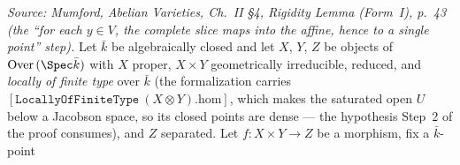 \begin{lemma}
  \label{lem:rigidity_eqOn_saturated_open_to_affine}

  \textit{Source: Mumford, Abelian Varieties, Ch.~II \S4, Rigidity Lemma (Form~I), p.~43 (the
  ``for each \(y \in V\), the complete slice maps into the affine, hence to a single point'' step).}
  Let \(\bar k\) be algebraically closed and let \(X\), \(Y\), \(Z\) be objects of
  \(\mathrm{Over}\,(\Spec \bar k)\) with \(X\) proper, \(X \times Y\) geometrically irreducible, reduced,
  and \emph{locally of finite type} over \(\bar k\) (the formalization carries
  \([\mathtt{LocallyOfFiniteType}\ (X \otimes Y).\mathrm{hom}]\), which makes the saturated open \(U\)
  below a Jacobson space, so its closed points are dense --- the hypothesis Step~2 of the proof
  consumes), and \(Z\) separated. Let \(f \colon X \times Y \to Z\) be a morphism, fix a \(\bar k\)-point

\end{lemma}
